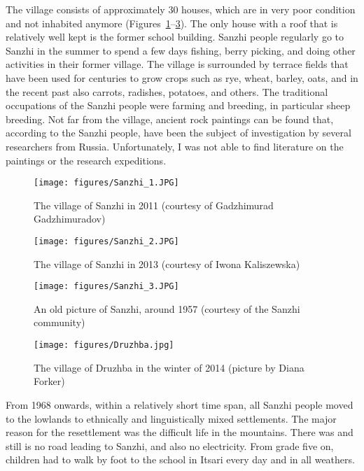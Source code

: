 The village consists of approximately 30 houses, which are in very poor condition and not inhabited anymore (Figures~\ref{fig:Sanzhi 1}--\ref{fig:Sanzhi 3}). The only house with a roof that is relatively well kept is the former school building. Sanzhi people regularly go to Sanzhi in the summer to spend a few days fishing, berry picking, and doing other activities in their former village. The village is surrounded by terrace fields that have been used for centuries to grow crops such as rye, wheat, barley, oats, and in the recent past also carrots, radishes, potatoes, and others. The traditional occupations of the Sanzhi people were farming and breeding, in particular sheep breeding. Not far from the village, ancient rock paintings can be found that, according to the Sanzhi people, have been the subject of investigation by several researchers from Russia. Unfortunately, I was not able to find literature on the paintings or the research expeditions.

\begin{figure}[p]
	\caption{The village of Sanzhi in 2011 (courtesy of Gadzhimurad Gadzhimuradov)}
	\label{fig:Sanzhi 1}
	\texttt{[image: figures/Sanzhi\_1.JPG]}
\end{figure}

\begin{figure}[p]
	\caption{The village of Sanzhi in 2013 (courtesy of Iwona Kaliszewska)}
	\label{fig:Sanzhi 2}
	\texttt{[image: figures/Sanzhi\_2.JPG]}
\end{figure}

\begin{figure}[p]
	\caption{An old picture of Sanzhi, around 1957 (courtesy of the Sanzhi community)}
	\label{fig:Sanzhi 3}
	\texttt{[image: figures/Sanzhi\_3.JPG]}
\end{figure}

\begin{figure}[p]
	\caption{The village of Druzhba in the winter of 2014 (picture by Diana Forker)}
	\label{fig:Druzhba}
	\texttt{[image: figures/Druzhba.jpg]}
\end{figure}




From 1968 onwards, within a relatively short time span, all Sanzhi people moved to the lowlands to ethnically and linguistically mixed settlements. The major reason for the resettlement was the difficult life in the mountains. There was and still is no road leading to Sanzhi, and also no electricity. From grade five on, children had to walk by foot to the school in Itsari every day and in all weathers.

